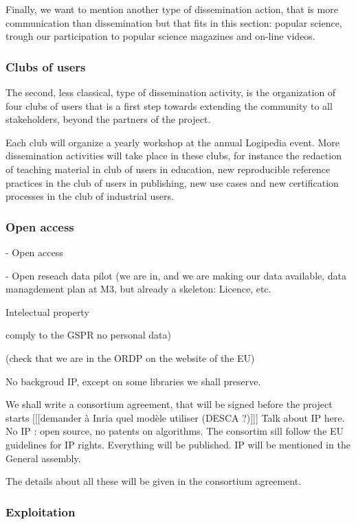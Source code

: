 Finally, we want to mention another type of dissemination action, that
is more communication than dissemination but that fits in this
section: popular science, trough our participation to popular science
magazines and on-line videos.

\subsubsection*{Clubs of users}

The second, less classical, type of dissemination activity, is the
organization of four clubs of users that is a first step towards
extending the community to all stakeholders, beyond the partners of
the project.

Each club will organize a yearly workshop at the annual Logipedia
event. More dissemination activities will take place in these clubs,
for instance the redaction of teaching material in club of users in
education, new reproducible reference practices in the club of users
in publishing, new use cases and new certification processes in the
club of industrial users.



\subsubsection*{Open access}

- Open access

- Open reseach data pilot (we are in, and we are making our data available,
data managdement plan at M3, but already a skeleton: Licence, etc.

Intelectual property

comply to the GSPR no personal data)

(check that we are in the ORDP on the website of the EU)

No backgroud IP, except on some libraries
we shall preserve.

We shall write a consortium agreement, that will be signed before the
project starts [[[demander à Inria quel modèle utiliser (DESCA ?)]]]
Talk about IP here. No IP : open source, no patents on algorithms.
The consortim sill follow the EU guidelines for IP rights.
Everything will be published. IP will be mentioned in the General assembly.

The details about all these will be given in the consortium agreement.
 
\subsubsection*{Exploitation}

